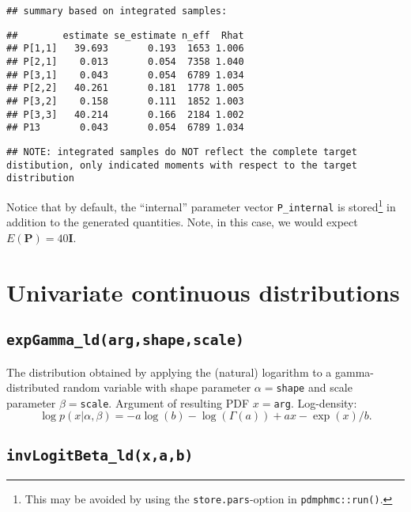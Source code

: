 \documentclass[
]{book}
\begin{document}
\begin{verbatim}
## summary based on integrated samples:
\end{verbatim}

\begin{verbatim}
##        estimate se_estimate n_eff  Rhat
## P[1,1]   39.693       0.193  1653 1.006
## P[2,1]    0.013       0.054  7358 1.040
## P[3,1]    0.043       0.054  6789 1.034
## P[2,2]   40.261       0.181  1778 1.005
## P[3,2]    0.158       0.111  1852 1.003
## P[3,3]   40.214       0.166  2184 1.002
## P13       0.043       0.054  6789 1.034
\end{verbatim}

\begin{verbatim}
## NOTE: integrated samples do NOT reflect the complete target distibution, only indicated moments with respect to the target distribution
\end{verbatim}

Notice that by default, the ``internal'' parameter vector \texttt{P\_internal} is stored\footnote{This may be avoided by using the \texttt{store.pars}-option in \texttt{pdmphmc::run()}.} in addition to the generated quantities. Note, in this case, we would expect \(E(\mathbf P)=40 \mathbf I\).

\hypertarget{univariate-continuous-distributions}{%
\section{Univariate continuous distributions}\label{univariate-continuous-distributions}}

\hypertarget{expgamma_ldargshapescale}{%
\subsection{\texorpdfstring{\texttt{expGamma\_ld(arg,shape,scale)}}{expGamma\_ld(arg,shape,scale)}}\label{expgamma_ldargshapescale}}

The distribution obtained by applying the (natural) logarithm to a gamma-distributed random variable with shape parameter \(\alpha=\)\texttt{shape} and scale parameter \(\beta=\)\texttt{scale}. Argument of resulting PDF \(x=\)\texttt{arg}. Log-density:
\[
\log p(x|\alpha,\beta) = -a\log(b) - \log(\Gamma(a)) + ax - \exp(x)/b.
\]

\hypertarget{invlogitbeta_ldxab}{%
\subsection{\texorpdfstring{\texttt{invLogitBeta\_ld(x,a,b)}}{invLogitBeta\_ld(x,a,b)}}\label{invlogitbeta_ldxab}}
\end{document}
